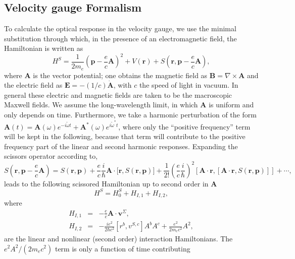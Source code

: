 \documentclass[floatfix,prb,aps,superscriptaddress,11pt]{revtex4}
\begin{document}
\subsection{Velocity gauge Formalism}

To calculate the optical response in the velocity gauge, we use the minimal
substitution through which, in the presence of an electromagnetic field, the
Hamiltonian is written as 
\begin{equation}
H^{S}=\frac{1}{2m_e}(\mathbf{p}-\frac{e}{c}\mathbf{A})^{2}+V(\mathbf{r})+S(\mathbf{r},\mathbf{p}-\frac{e}{c}
\mathbf{A}),  
\label{hsa}
\end{equation}
where $\mathbf{A}$ is the vector potential; one obtains the magnetic field as $\mathbf{B}
=\nabla \times \mathbf{A}$ and the electric field as $\mathbf{E}=-(1/c)\dot{\mathbf{A}}$, with 
$c$ the speed of light in vacuum. In general these electric and magnetic
fields are taken to be the macroscopic Maxwell fields. We assume the
long-wavelength limit, in which $\mathbf{A}$ is uniform and only depends on time.
Furthermore, we take a harmonic perturbation of the form 
$\mathbf{A}(t)=\mathbf{A}(\omega)e^{-i\tilde\omega t}+\mathbf{A}^{\ast }(\omega)e^{i\tilde\omega^{\ast }t}$, 
where
only the
``positive frequency'' term will be kept in
the following, because that term will contribute to the positive frequency
part of the linear and second harmonic responses. Expanding the scissors
operator according to,\cite{nastosPRB05} 
\begin{equation*}
S(\mathbf{r},\mathbf{p}-\frac{e}{c}\mathbf{A})=S(\mathbf{r},\mathbf{p})+\frac{e}{c}\frac{i}{\hbar }\mathbf{A}
\cdot \lbrack \mathbf{r},S(\mathbf{r},\mathbf{p})]+\frac{1}{2!}\left( \frac{e}{c}\frac{i}{
\hbar }\right) ^{2}[\mathbf{A}\cdot \mathbf{r},[\mathbf{A}\cdot \mathbf{r},S(\mathbf{r},\mathbf{p})]]+\cdots ,
\label{sc}
\end{equation*}
leads to the following scissored Hamiltonian up to second order in $\mathbf{A}$
\begin{equation*}
H^{S}=H_{0}^{S}+H_{I,1}+H_{I,2},
\end{equation*}
where 
\begin{eqnarray}
H_{I,1} &=&-\frac{e}{c}\mathbf{A}\cdot \mathbf{v}^{\Sigma},  \label{hsnll} \\
H_{I,2} &=&-\frac{ie^{2}}{2\hbar c^{2}}[r^{b},v^{S,c}]A^{b}A^{c}+\frac{e^{2}
}{2m_ec^{2}}A^{2},
\end{eqnarray}
are the linear and nonlinear (second order) interaction Hamiltonians. The 
$e^{2}A^{2}/(2m_ec^{2})$ term is only a function of time contributing
\end{document}
